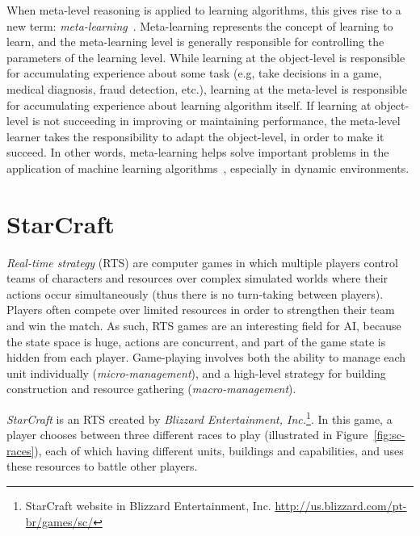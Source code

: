 When meta-level reasoning is applied to learning algorithms, this gives rise to a new term: \textit{meta-learning}~\cite{schweighofer2003meta, doya2002metalearning}.
Meta-learning represents the concept of learning to learn, and the meta-learning level is generally responsible for controlling the parameters of the learning level.
While learning at the object-level is responsible for accumulating experience about some task (e.g, take decisions in a game, medical diagnosis, fraud detection, etc.), learning at the meta-level is responsible for accumulating experience about learning algorithm itself. 
If learning at object-level is not succeeding in improving or maintaining performance, the meta-level learner takes the responsibility to adapt the object-level, in order to make it succeed.
In other words, meta-learning helps solve important problems in the application of machine learning algorithms~\cite{vilalta2004using}, especially in dynamic environments.



\section{StarCraft}
\label{sec:sc}

\emph{Real-time strategy} (RTS) are computer games in which multiple players control teams of characters and resources over complex simulated worlds where their actions occur simultaneously (thus there is no turn-taking between players). 
Players often compete over limited resources in order to strengthen their team and win the match. 
As such, RTS games are an interesting field for AI, because the state space is huge, actions are concurrent, and part of the game state is hidden from each player. 
Game-playing involves both the ability to manage each unit individually (\textit{micro-management}), and a high-level strategy for building construction and resource gathering (\textit{macro-management}). 

\textit{StarCraft} is an RTS created by \textit{Blizzard Entertainment, Inc.}\footnote{
StarCraft website in Blizzard Entertainment, Inc. \url{http://us.blizzard.com/pt-br/games/sc/}}.
In this game, a player chooses between three different races to play (illustrated in Figure~\ref{fig:sc-races}), each of which having different units, buildings and capabilities, and uses these resources to battle other players.

